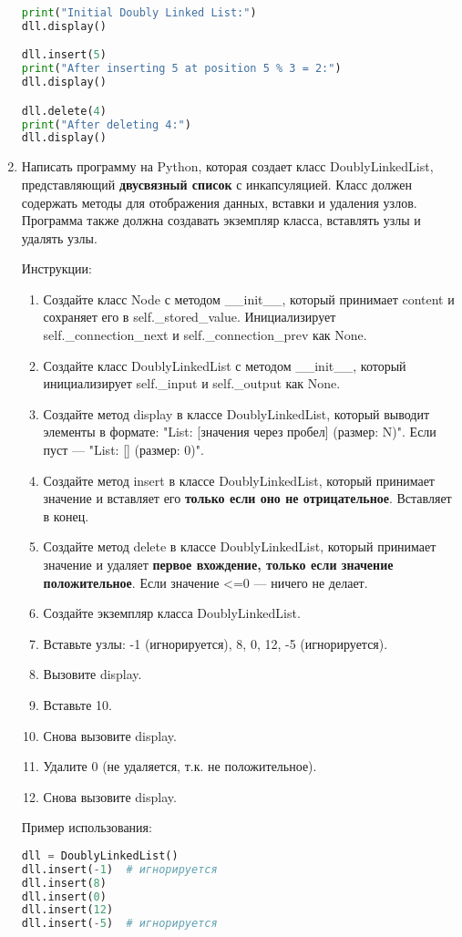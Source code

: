 \begin{enumerate}
\begin{lstlisting}[language=Python]
print("Initial Doubly Linked List:")
dll.display()

dll.insert(5)
print("After inserting 5 at position 5 % 3 = 2:")
dll.display()

dll.delete(4)
print("After deleting 4:")
dll.display()
\end{lstlisting}

\item Написать программу на Python, которая создает класс DoublyLinkedList, представляющий \textbf{двусвязный список} с инкапсуляцией. Класс должен содержать методы для отображения данных, вставки и удаления узлов. Программа также должна создавать экземпляр класса, вставлять узлы и удалять узлы.

Инструкции:
\begin{enumerate}
    \item Создайте класс Node с методом \_\_init\_\_, который принимает content и сохраняет его в self.\_stored\_value. Инициализирует self.\_connection\_next и self.\_connection\_prev как None.
    \item Создайте класс DoublyLinkedList с методом \_\_init\_\_, который инициализирует self.\_input и self.\_output как None.
    \item Создайте метод display в классе DoublyLinkedList, который выводит элементы в формате: "List: [значения через пробел] (размер: N)". Если пуст — "List: [] (размер: 0)".
    \item Создайте метод insert в классе DoublyLinkedList, который принимает значение и вставляет его \textbf{только если оно не отрицательное}. Вставляет в конец.
    \item Создайте метод delete в классе DoublyLinkedList, который принимает значение и удаляет \textbf{первое вхождение, только если значение положительное}. Если значение <=0 — ничего не делает.
    \item Создайте экземпляр класса DoublyLinkedList.
    \item Вставьте узлы: -1 (игнорируется), 8, 0, 12, -5 (игнорируется).
    \item Вызовите display.
    \item Вставьте 10.
    \item Снова вызовите display.
    \item Удалите 0 (не удаляется, т.к. не положительное).
    \item Снова вызовите display.
\end{enumerate}

Пример использования:
\begin{lstlisting}[language=Python]
dll = DoublyLinkedList()
dll.insert(-1)  # игнорируется
dll.insert(8)
dll.insert(0)
dll.insert(12)
dll.insert(-5)  # игнорируется


\end{lstlisting}
\end{enumerate}
